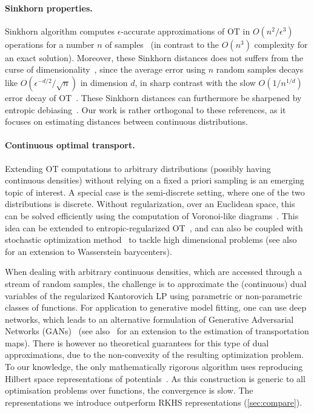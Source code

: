 \paragraph{Sinkhorn properties.} Sinkhorn algorithm computes $\epsilon$-accurate
approximations of OT in $O(n^2/\epsilon^3)$ operations for a number $n$ of
samples~\cite{altschuler2017near} (in contrast to the $O(n^3)$ complexity for an
exact solution). Moreover, these Sinkhorn distances does not suffers from the
curse of dimensionality~\cite{2019-Genevay-aistats}, since the average error
using $n$ random samples decays like $O(\epsilon^{-d/2}/\sqrt{n})$ in dimension
$d$, in sharp contrast with the slow $O(1/n^{1/d})$ error decay of
OT~\cite{dudley_speed_1969,weed2019sharp}. These Sinkhorn distances can furthermore be sharpened
by entropic debiasing~\cite{2019-Feydy-aistats}. Our work is rather orthogonal to these references, as it focuses on estimating distances between continuous distributions.

\paragraph{Continuous optimal transport.} Extending OT computations to arbitrary distributions
(possibly having continuous densities) without relying on a fixed a priori
sampling is an emerging topic of interest. A special case is the semi-discrete
setting, where one of the two distributions is discrete. Without regularization,
over an Euclidean space, this can be solved efficiently using the computation of
Voronoi-like diagrams~\cite{merigot2011multiscale}. This idea can be extended to
entropic-regularized OT~\cite{cuturi2018semidual}, and can also be coupled with
stochastic optimization method~\cite{2016-genevay-nips} to tackle high
dimensional problems (see also~\citet{staib2017parallel} for an extension to Wasserstein barycenters). 

When dealing with arbitrary continuous densities, which are accessed through a
stream of random samples, the challenge is to approximate  the (continuous) dual
variables of the regularized Kantorovich LP using parametric or non-parametric
classes of functions. For application to generative model fitting, one can use
deep networks, which leads to an alternative formulation of Generative
Adversarial Networks (GANs)~\cite{arjovsky2017wgan} (see
also~\citet{seguy2018large} for an extension to the estimation of transportation
maps). There is however no theoretical guarantees for this type of dual
approximations, due to the non-convexity of the resulting optimization problem.
To our knowledge, the only mathematically rigorous algorithm uses reproducing
Hilbert space representations of potentials~\cite{2016-genevay-nips}. As this
construction is generic to all optimisation problems over functions, the convergence is slow. The representations we introduce outperform RKHS representations (\autoref{sec:compare}).
